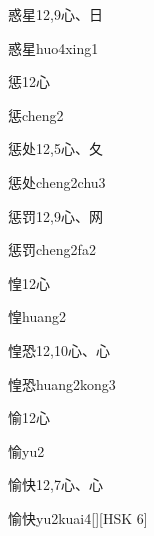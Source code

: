 \begin{Entry}{惑星}{12,9}{⼼、⽇}
  \begin{Phonetics}{惑星}{huo4xing1}
  \end{Phonetics}
\end{Entry}

\begin{Entry}{惩}{12}{⼼}
  \begin{Phonetics}{惩}{cheng2}
  \end{Phonetics}
\end{Entry}

\begin{Entry}{惩处}{12,5}{⼼、⼡}
  \begin{Phonetics}{惩处}{cheng2chu3}
  \end{Phonetics}
\end{Entry}

\begin{Entry}{惩罚}{12,9}{⼼、⽹}
  \begin{Phonetics}{惩罚}{cheng2fa2}
  \end{Phonetics}
\end{Entry}

\begin{Entry}{惶}{12}{⼼}
  \begin{Phonetics}{惶}{huang2}
  \end{Phonetics}
\end{Entry}

\begin{Entry}{惶恐}{12,10}{⼼、⼼}
  \begin{Phonetics}{惶恐}{huang2kong3}
  \end{Phonetics}
\end{Entry}

\begin{Entry}{愉}{12}{⼼}
  \begin{Phonetics}{愉}{yu2}
  \end{Phonetics}
\end{Entry}

\begin{Entry}{愉快}{12,7}{⼼、⼼}
  \begin{Phonetics}{愉快}{yu2kuai4}[][HSK 6]
  \end{Phonetics}
\end{Entry}

